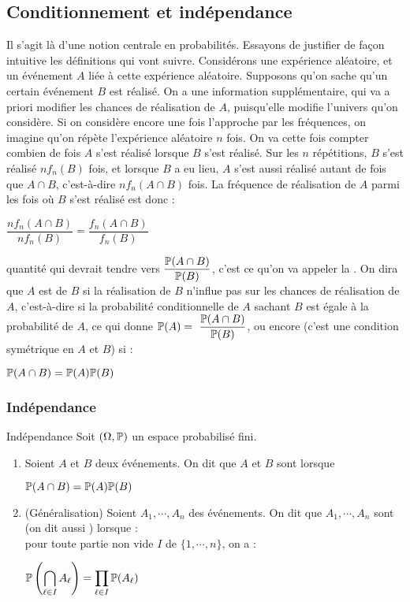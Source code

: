 \documentclass[12pt,a4paper]{report}
\begin{document}
\subsection{Conditionnement et indépendance}

Il s'agit là d'une notion centrale en probabilités. Essayons de justifier de façon intuitive les définitions qui vont suivre. Considérons une expérience aléatoire, et 
un événement $A$ liée à cette expérience aléatoire. Supposons qu'on sache qu'un certain événement $B$ est réalisé. On a une information supplémentaire, qui va a 
priori modifier les chances de réalisation de $A$, puisqu'elle modifie l'univers qu'on considère. Si on considère encore une fois l'approche par les fréquences, on 
imagine qu'on répète l'expérience aléatoire $n$ fois. On va cette fois compter combien de fois $A$ s'est réalisé lorsque $B$ s'est réalisé. Sur les $n$ répétitions, 
$B$ s'est réalisé $nf_n(B)$ fois, et lorsque $B$ a eu lieu, $A$ s'est aussi réalisé autant de fois que $A \cap B$, c'est-à-dire $nf_n(A \cap B)$ fois. La fréquence de 
réalisation de $A$ parmi les fois où $B$ s'est réalisé est donc :
\begin{center}
$\dfrac{nf_n(A \cap B)}{nf_n(B)} = \dfrac{f_n(A\cap B)}{f_n(B)}$
\end{center}
quantité qui devrait tendre vers $\dfrac{\mathbb{P}(A \cap B)}{\mathbb{P}(B)}$, c'est ce qu'on va appeler la . On dira que $A$ 
est  de $B$ si la réalisation de $B$ n'influe pas sur les chances de réalisation de $A$, c'est-à-dire si la probabilité conditionnelle de $A$ 
sachant $B$ est égale à la probabilité de $A$, ce qui donne $\p(A) = \dfrac{\p(A \cap B)}{\p(B)}$, ou encore (c'est une condition symétrique en $A$ et $B$) si :
\begin{center}
$\mathbb{P}(A \cap B) = \mathbb{P}(A) \mathbb{P}(B)$
\end{center}

\subsubsection{Indépendance}

\begin{definition}{Indépendance}{}
Soit $(\Omega,\mathbb{P})$ un espace probabilisé fini.
\begin{enumerate}
	\item Soient $A$ et $B$ deux événements. On dit que $A$ et $B$ sont  lorsque 
	\begin{center}
	$\mathbb{P}(A \cap B) = \mathbb{P}(A) \mathbb{P}(B)$
	\end{center}
	\item (Généralisation) Soient $A_1,\cdots,A_n$ des événements. On dit que $A_1,\cdots,A_n$ sont  (on dit aussi ) lorsque : \\
	pour toute partie non vide $I$ de $\{1,\cdots,n\}$, on a :
	\begin{center}
	$\displaystyle \mathbb{P}\left(\bigcap_{\ell \in I} A_\ell\right) = \prod_{\ell \in I} \mathbb{P}(A_\ell)$
	\end{center}
\end{enumerate}
\end{definition}
\end{document}
